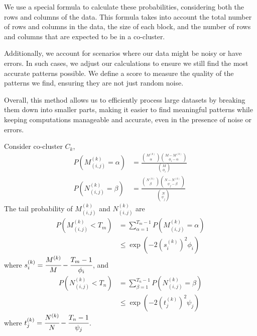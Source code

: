 We use a special formula to calculate these probabilities, considering both the rows and columns of the data. This formula takes into account the total number of rows and columns in the data, the size of each block, and the number of rows and columns that are expected to be in a co-cluster.

Additionally, we account for scenarios where our data might be noisy or have errors. In such cases, we adjust our calculations to ensure we still find the most accurate patterns possible. We define a score to measure the quality of the patterns we find, ensuring they are not just random noise.

Overall, this method allows us to efficiently process large datasets by breaking them down into smaller parts, making it easier to find meaningful patterns while keeping computations manageable and accurate, even in the presence of noise or errors.

\appendix
Consider co-cluster $C_k$,
\begin{align*}
    P(M_{(i,j)}^{(k)} = \alpha) & = \frac{\binom{M^{(k)}}{\alpha} \binom{M-M^{(k)}}{\phi_i-\alpha}}{\binom{M}{\phi_i}} \\
    P(N_{(i,j)}^{(k)} = \beta)  & = \frac{\binom{N^{(k)}}{\beta} \binom{N-N^{(k)}}{\psi_j-\beta}}{\binom{N}{\psi_j}}
\end{align*}
The tail probability of $M_{(i,j)}^{(k)}$ and $N_{(i,j)}^{(k)}$ are
\begin{align*}
    P(M_{(i,j)}^{(k)} < T_m) & = \sum_{\alpha=1}^{T_m-1} P(M_{(i,j)}^{(k)} = \alpha) \\
                             & \le \exp(-2 (s_i^{(k)})^2 \phi_i)
\end{align*}
where $s_i^{(k)} = \cfrac{M^{(k)}}{M}-\cfrac{T_m-1}{\phi_i}$, and
\begin{align*}
    P(N_{(i,j)}^{(k)} < T_n) & = \sum_{\beta=1}^{T_n-1} P(N_{(i,j)}^{(k)} = \beta) \\
                             & \le \exp (-2 (t_j^{(k)})^2 \psi_j)
\end{align*}
where $t_j^{(k)} = \cfrac{N^{(k)}}{N}-\cfrac{T_n-1}{\psi_j}$.

